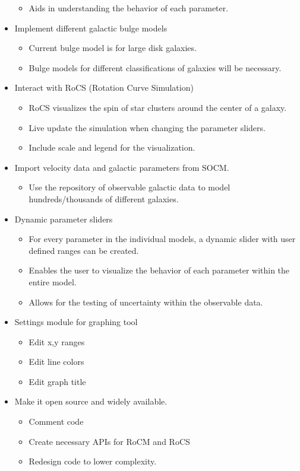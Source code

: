 \documentclass{article}
\begin{document}
\begin{itemize}
\begin{itemize}
		\item Aids in understanding the behavior of each parameter.
	\end{itemize}
	\item Implement different galactic bulge models
	\begin{itemize}
		\item Current bulge model is for large disk galaxies.
		\item Bulge models for different classifications of galaxies will be necessary.
	\end{itemize}
	\item Interact with RoCS (Rotation Curve Simulation)
	\begin{itemize}
		\item RoCS visualizes the spin of star clusters around the center of a galaxy. 
		\item Live update the simulation when changing the parameter sliders.
		\item Include scale and legend for the visualization.
	\end{itemize}
	\item Import velocity data and galactic parameters from SOCM.
	\begin{itemize}
		\item Use the repository of observable galactic data to model hundreds/thousands of different galaxies.
	\end{itemize}
	\item Dynamic parameter sliders
	\begin{itemize}
		\item For every parameter in the individual models, a dynamic slider with user defined ranges can be created. 
		\item Enables the user to visualize the behavior of each parameter within the entire model.
		\item Allows for the testing of uncertainty within the observable data.
	\end{itemize}
	\item Settings module for graphing tool
	\begin{itemize}
		\item Edit x,y ranges
		\item Edit line colors
		\item Edit graph title
	\end{itemize}
	\item Make it open source and widely available.
	\begin{itemize}
		\item Comment code
		\item Create necessary APIs for RoCM and RoCS
		\item Redesign code to lower complexity.	
	\end{itemize}
\end{itemize}
\end{document}
